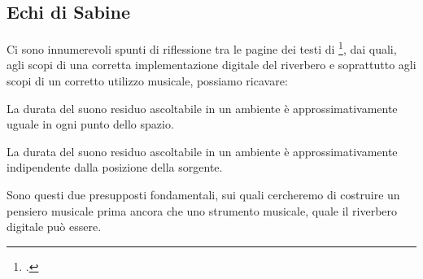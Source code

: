 \subsection{Echi di Sabine}

Ci sono innumerevoli spunti di riflessione tra le pagine dei testi di \ws\footcite{ws:rev},
dai quali, agli scopi di una corretta implementazione digitale del riverbero e
soprattutto agli scopi di un corretto utilizzo musicale, possiamo ricavare:

\begin{compactitem}
  \item La durata del suono residuo ascoltabile in un ambiente è approssimativamente
  uguale in ogni punto dello spazio.
  \item La durata del suono residuo ascoltabile in un ambiente è approssimativamente
  indipendente dalla posizione della sorgente.
\end{compactitem}

Sono questi due presupposti fondamentali, sui quali cercheremo di costruire un
pensiero musicale prima ancora che uno strumento musicale, quale il riverbero
digitale può essere.
